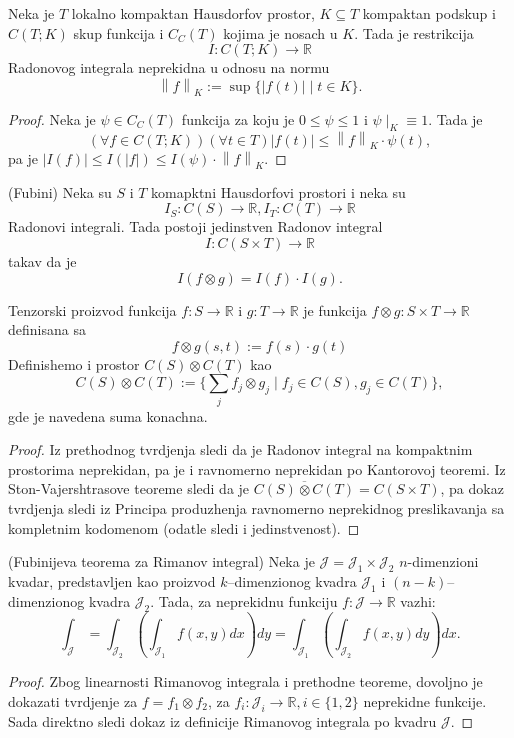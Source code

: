 \documentclass[a4paper,12pt]{article}
\newcommand{\RR}{\mathbb{R}}
\newcommand{\psj}{\subseteq}
\newcommand{\norm}[1]{\left\lVert#1\right\rVert}
\begin{document}
\begin{tvr}
	Neka je $T$ lokalno kompaktan Hausdorfov prostor, $K \psj T$ kompaktan podskup i $C(T; K)$ skup funkcija i $C_C(T)$
	kojima je nosach u $K$. Tada je restrikcija
	\[ I:C(T;K) \to \RR \] 
	Radonovog integrala neprekidna u odnosu na normu
	\[ \norm{f}_K := \sup\{|f(t)| \mid t\in K\} .\] 
\end{tvr}
\begin{proof}
	Neka je $\psi \in  C_C(T)$ funkcija za koju je $0 \leq \psi \leq 1$ i $\psi \mid_{K} \equiv 1$. Tada je 
	\[ (\forall f \in C(T; K))(\forall t \in T) |f(t)| \leq \norm{f}_K \cdot \psi(t) ,\] 
	pa je $|I(f)| \leq I(|f|) \leq I(\psi) \cdot \norm{f}_K$.
\end{proof}

\begin{tma}(Fubini)
	Neka su $S$ i $T$ komapktni Hausdorfovi prostori i neka su 
	\[ I_S : C(S) \to \RR ,  I_T : C(T) \to \RR\] 
	Radonovi integrali. Tada postoji jedinstven Radonov integral 
	\[ I:C(S\times T) \to \RR \] 
	takav da je 
	\[ I(f\otimes g) = I(f)\cdot I(g) .\] 
\end{tma}

\begin{nap}
	Tenzorski proizvod funkcija $f:S\to \RR$ i $g:T\to \RR$ je funkcija $f\otimes g:S\times T \to \RR$
	definisana sa 
	\[ f\otimes g(s, t) := f(s)\cdot g(t) \] 
	Definishemo i prostor $C(S)\otimes C(T)$ kao
	\[ C(S)\otimes C(T) := \Big\{\sum_j f_j\otimes g_j\mid f_j \in C(S), g_j \in C(T)\Big\},\] 
	gde je navedena suma konachna.
\end{nap}
\begin{proof}
	Iz prethodnog tvrdjenja sledi da je Radonov integral na kompaktnim prostorima neprekidan,
	pa je i ravnomerno neprekidan po Kantorovoj teoremi. Iz Ston-Vajershtrasove teoreme sledi
	da je $\overline{C(S)\otimes C(T)} = C(S\times T)$, pa dokaz tvrdjenja sledi iz Principa
	produzhenja ravnomerno neprekidnog preslikavanja sa kompletnim kodomenom (odatle 
	sledi i jedinstvenost).
\end{proof}

\begin{posl}(Fubinijeva teorema za Rimanov integral)
	Neka je $\mathcal{J} = \mathcal{J}_1 \times \mathcal{J}_2$ $n$-dimenzioni kvadar,
	predstavljen kao proizvod $k$--dimenzionog kvadra $\mathcal J_1$ i $(n-k)$--dimenzionog kvadra $\mathcal J_2$.
	Tada, za neprekidnu funkciju $f:\mathcal{J}\to \RR$ vazhi:
	\[ \int_{\mathcal J} = \int_{\mathcal J_2} \left(\int_{\mathcal J_1}f(x, y) dx \right) dy = \int_{\mathcal J_1} \left(\int_{\mathcal J_2}f(x, y) dy \right) dx.\] 
\end{posl}
\begin{proof}
	Zbog linearnosti Rimanovog integrala i prethodne teoreme, dovoljno je dokazati tvrdjenje
	za $f = f_1 \otimes f_2$, za $f_i:\mathcal J_i \to \RR, i \in \{1, 2\}$ neprekidne funkcije.
	Sada direktno sledi dokaz iz definicije Rimanovog integrala po kvadru $\mathcal J$.
\end{proof}
\end{document}
